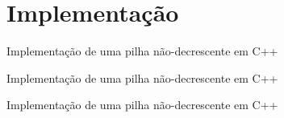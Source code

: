 \section{Implementação}

\begin{frame}[fragile]{Implementação de uma pilha não-decrescente em C++}
\end{frame}

\begin{frame}[fragile]{Implementação de uma pilha não-decrescente em C++}
\end{frame}

\begin{frame}[fragile]{Implementação de uma pilha não-decrescente em C++}
\end{frame}

